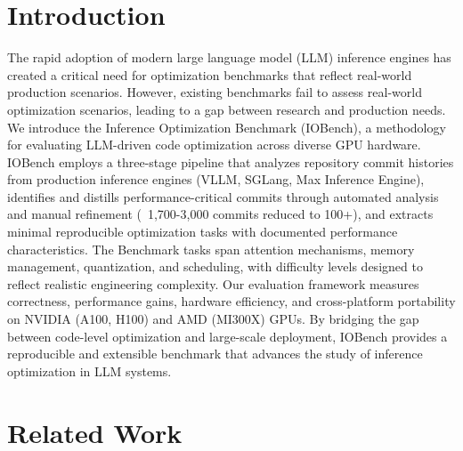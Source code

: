 \documentclass{article}
\theoremstyle{plain}
\theoremstyle{definition}
\theoremstyle{remark}
\begin{document}
\printAffiliationsAndNotice{}  %

\begin{abstract}
  This document provides a basic paper template and submission guidelines.
  Abstracts must be a single paragraph, ideally between 4--6 sentences long.
  Gross violations will trigger corrections at the camera-ready phase.
\end{abstract}

\section{Introduction}

The rapid adoption of modern large language model (LLM) inference engines has created a critical need for optimization benchmarks that reflect real-world production scenarios. However,  existing benchmarks fail to assess real-world optimization scenarios, leading to a gap between research and production needs. We introduce the Inference Optimization Benchmark (IOBench), a methodology for evaluating LLM-driven code optimization across diverse GPU hardware. IOBench employs a three-stage pipeline that analyzes repository commit histories from production inference engines (VLLM, SGLang, Max Inference Engine), identifies and distills performance-critical commits through automated analysis and manual refinement (~1,700-3,000 commits reduced to 100+), and extracts minimal reproducible optimization tasks with documented performance characteristics. 
The Benchmark tasks span attention mechanisms, memory management, quantization, and scheduling, with difficulty levels designed to reflect realistic engineering complexity. Our evaluation framework measures correctness, performance gains, hardware efficiency, and cross-platform portability on NVIDIA (A100, H100) and AMD (MI300X) GPUs. By bridging the gap between code-level optimization and large-scale deployment, IOBench provides a reproducible and extensible benchmark that advances the study of inference optimization in LLM systems.


\section{Related Work}
\label{sec:related}
\end{document}
